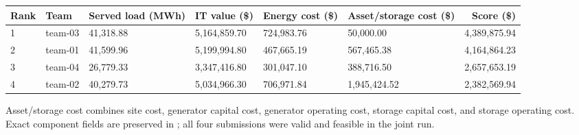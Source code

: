 \scriptsize
\begin{tabularx}{\textwidth}{X X l l l l r}
\toprule
Rank & Team & Served load (MWh) & IT value (\$) & Energy cost (\$) & Asset/storage cost (\$) & Score (\$)\\
\midrule
1 & team-03 & 41,318.88 & 5,164,859.70 & 724,983.76 & 50,000.00 & 4,389,875.94\\
2 & team-01 & 41,599.96 & 5,199,994.80 & 467,665.19 & 567,465.38 & 4,164,864.23\\
3 & team-04 & 26,779.33 & 3,347,416.80 & 301,047.10 & 388,716.50 & 2,657,653.19\\
4 & team-02 & 40,279.73 & 5,034,966.30 & 706,971.84 & 1,945,424.52 & 2,382,569.94\\
\bottomrule
\end{tabularx}

\vspace{0.4em}
\noindent\footnotesize
Asset/storage cost combines site cost, generator capital cost, generator operating
cost, storage capital cost, and storage operating cost. Exact component fields
are preserved in ; all four submissions were valid and
feasible in the joint run.
